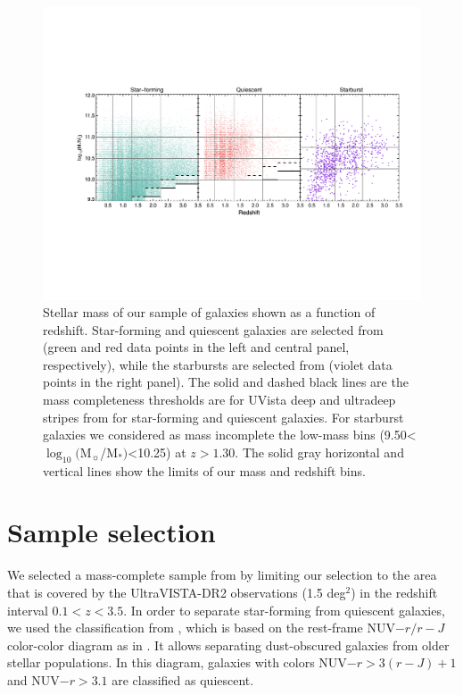    \begin{figure}
   \centering
   \includegraphics[trim={2cm 6cm 1cm 5.5cm}, clip, width=\textwidth]{Figs/M_vs_z_separate.pdf}
    \caption{ Stellar mass of our sample of galaxies shown as a function of redshift. Star-forming and quiescent galaxies are selected from \citet{2016ApJS..224...24L} (green and red data points in the left and central panel, respectively), while the starbursts are selected from \citet{2013MNRAS.432...23G} (violet data points in the right panel).
                        The solid and dashed black lines are the mass completeness thresholds are for UVista
                        deep and ultradeep stripes from \citet{2016ApJS..224...24L} for star-forming and
                        quiescent galaxies. For starburst galaxies we considered as mass incomplete the low-mass
                        bins (9.50<$\log_{10}($M$_\sun$/M$_*)$<10.25) at $z>1.30$.
                The solid gray horizontal and vertical lines show the limits of our mass and redshift bins.
                }
         \label{fig:M_vs_z}
   \end{figure}


\section{Sample selection} \label{sec:sample}
We selected a mass-complete sample from \citet{2016ApJS..224...24L} by limiting our selection to the area that is covered by the UltraVISTA-DR2 observations (1.5 deg$^2$) in the redshift interval $0.1<z<3.5$. In order to separate star-forming from quiescent galaxies, we used the classification from \citet{2016ApJS..224...24L}, which  is based on the rest-frame NUV$ - r / r - J$ color-color diagram as in \citet{2013A&A...556A..55I}. It allows separating dust-obscured galaxies from older stellar populations. In this diagram, galaxies with colors NUV$ - r>3 (r-J)+1$ and NUV$ - r > 3.1$ are classified as quiescent.

